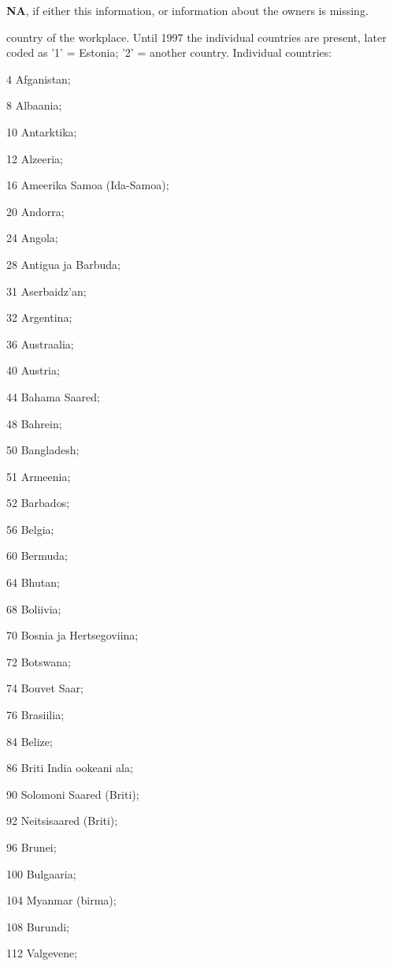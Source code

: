 \documentclass[a4paper]{article}
\newcommand{\NA}{\textbf{NA}\xspace}
\begin{document}
\begin{description}
  \NA, if either this information, or information about the owners is missing.
\item[workCountry] country of the workplace.  Until 1997 the
  individual countries are present, later coded as '1' = Estonia; '2'
  = another country.  Individual countries:
  \begin{inparaitem}
    \item[4] Afganistan;
    \item[8] Albaania;
    \item[10] Antarktika;
    \item[12] Alzeeria;
    \item[16] Ameerika Samoa (Ida-Samoa);
    \item[20] Andorra;
    \item[24] Angola;
    \item[28] Antigua ja Barbuda;
    \item[31] Aserbaidz'an;
    \item[32] Argentina;
    \item[36] Austraalia;
    \item[40] Austria;
    \item[44] Bahama Saared;
    \item[48] Bahrein;
    \item[50] Bangladesh;
    \item[51] Armeenia;
    \item[52] Barbados;
    \item[56] Belgia;
    \item[60] Bermuda;
    \item[64] Bhutan;
    \item[68] Boliivia;
    \item[70] Bosnia ja Hertsegoviina;
    \item[72] Botswana;
    \item[74] Bouvet Saar;
    \item[76] Brasiilia;
    \item[84] Belize;
    \item[86] Briti India ookeani ala;
    \item[90] Solomoni Saared (Briti);
    \item[92] Neitsisaared (Briti);
    \item[96] Brunei;
    \item[100] Bulgaaria;
    \item[104] Myanmar (birma);
    \item[108] Burundi;
    \item[112] Valgevene;

\end{inparaitem}
\end{description}
\end{document}
